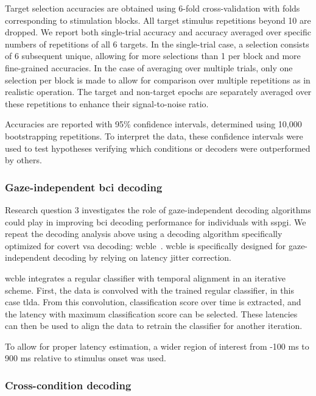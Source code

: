 \documentclass{article}
\begin{document}
Target selection accuracies are obtained using 6-fold cross-validation with
folds corresponding to stimulation blocks.
All target stimulus repetitions beyond 10 are dropped.
We report both single-trial accuracy and accuracy averaged over specific numbers
of repetitions of all 6 targets.
In the single-trial case, a selection consists of  6 subsequent unique, allowing
for more selections than 1 per block and more fine-grained accuracies.
In the case of averaging over multiple trials, only one selection per block is
made to allow for comparison over multiple repetitions as in realistic operation.
The target and non-target epochs are separately averaged over these repetitions
to enhance their signal-to-noise ratio.

Accuracies are reported with 95\% confidence intervals, determined using
10,000 bootstrapping repetitions.
To interpret the data, these confidence intervals were used to test hypotheses verifying which conditions
or decoders were outperformed by others.

\subsubsection{Gaze-independent \ac{bci} decoding}

Research question 3 investigates the role of gaze-independent decoding algorithms
could play in improving \ac{bci} decoding performance for individuals with \ac{sspgi}.
We repeat the decoding analysis above using a decoding algorithm specifically optimized
for covert \ac{vsa} decoding:  \ac{wcble}~\cite{VanDenKerchove2024}.
\ac{wcble} is specifically designed for gaze-independent decoding by relying
on latency jitter correction.

\Ac{wcble} integrates a regular classifier with temporal alignment in an iterative
scheme.
First, the data is convolved with the trained regular classifier, in this case
\ac{tlda}.
From this convolution, classification score over time is extracted, and the latency
with maximum classification score can be selected.
These latencies can then be used to align the data to retrain the classifier for
another iteration.

To allow for proper latency estimation, a wider region of interest from -100 ms
to 900 ms relative to stimulus onset was used.

\subsubsection{Cross-condition decoding}
\end{document}
